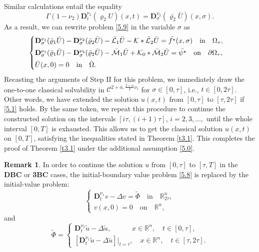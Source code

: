 \documentclass[reqno]{amsart}
\def\R {\mathbb{R}}
\def\C {\mathcal{C}}
\theoremstyle{definition}
\newtheorem{remark}[proposition]{Remark}
\numberwithin{equation}{section}
\begin{document}
Similar calculations entail the equality
\[
\Gamma(1-\nu_{2})\mathbf{D}_{t}^{\nu_{2}}(\varrho_2 U)(x,t)=\mathbf{D}_{\sigma}^{\nu_{2}}(\bar{\varrho_2} \bar{U})(x,\sigma).
\]
As a result, we can rewrite problem \eqref{5.9} in the variable $\sigma$ as
\begin{equation*}
\begin{cases}
\mathbf{D}_{\sigma}^{\nu_{1}}(\bar{\varrho}_{1}\bar{U})-\mathbf{D}_{\sigma}^{\nu_2}(\bar{\varrho}_{2}\bar{U})-\bar{\mathcal{L}}_{1}\bar{U}-\mathcal{K}*\bar{\mathcal{L}}_{2}\bar{U}
=\bar{f^\star}(x,\sigma)\quad \text{in}\quad \Omega_{\tau},\\
\noalign{\vskip1mm}
\mathbf{D}_{\sigma}^{\nu_{1}}(\bar{\varrho}_{1}\bar{U})-\mathbf{D}_{\sigma}^{\nu_2}(\bar{\varrho}_{2}\bar{U})-\bar{\mathcal{M}}_{1}\bar{U}+\mathcal{K}_{0}*\bar{\mathcal{M}}_{2}\bar{U}
=\bar{\psi^\star}\quad\text{on}\quad\partial\Omega_{\tau},\\
\noalign{\vskip1mm}
\bar{U}(x,0)=0\quad\text{in}\quad\bar{\Omega}.
\end{cases}
\end{equation*}
Recasting the arguments of Step II for this problem, we immediately draw the one-to-one classical solvability in $\C^{2+\alpha,\frac{2+\alpha}{2}\nu_{1}}$ for $\sigma\in[0,\tau]$, i.e., $t\in[0,2\tau]$. Other words, we have extended the solution $u(x,t)$ from $[0,\tau]$ to $[\tau,2\tau]$ if \eqref{5.1} holds.
By the same token, we repeat this procedure to continue the constructed solution on the intervals $[i\tau,(i+1)\tau]$, $i=2,3,...,$ until the whole interval $[0,T]$ is exhausted. This allows us to get the classical solution $u(x,t)$ on $[0,T]$, satisfying the inequalities stated in Theorem \ref{t3.1}. This completes the proof  of Theorem \ref{t3.1} under the additional assumption \eqref{5.0}.

\begin{remark}\label{r5.1}
In order to continue the solution $u$ from $[0,\tau]$ to $[\tau,T]$ in  the \textbf{DBC} or \textbf{3BC}
cases, the initial-boundary value problem \eqref{5.8} is replaced by the initial-value problem:
\[
\begin{cases}
\mathbf{D}_{t}^{\nu_{1}}v-\Delta v=\tilde{\Phi}\quad \text{in}\quad \R_{2\tau}^{n},\\
v(x,0)=0\quad \text{on}\quad \R^{n},
\end{cases}
\]
 and
\[
\tilde{\Phi}=
\begin{cases}
\mathbf{D}_{t}^{\nu_{1}}\tilde{u}-\Delta\tilde{u},\qquad\quad  x\in\R^{n},\quad t\in[0,\tau],\\
[\mathbf{D}_{t}^{\nu_{1}}\tilde{u}-\Delta\tilde{u}]|_{t=\tau},\quad x\in\R^{n},\quad t\in[\tau,2\tau].
\end{cases}
\]
\end{remark}
\end{document}
